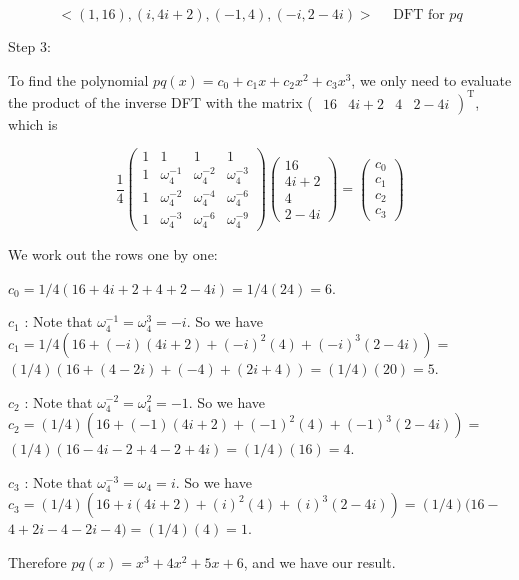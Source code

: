 $$
<(1,16),(i, 4 i+2),(-1,4),(-i, 2-4 i)>\quad \text { DFT for } p q
$$

Step 3:

To find the polynomial $p q(x)=c_{0}+c_{1} x+c_{2} x^{2}+c_{3} x^{3}$, we only need to evaluate the product of the inverse DFT with the matrix ( $\left.\begin{array}{llll}16 & 4 i+2 & 4 & 2-4 i\end{array}\right)^{\mathrm{T}}$, which is

$$
\frac{1}{4}\left(\begin{array}{cccc}
1 & 1 & 1 & 1 \\
1 & \omega_{4}^{-1} & \omega_{4}^{-2} & \omega_{4}^{-3} \\
1 & \omega_{4}^{-2} & \omega_{4}^{-4} & \omega_{4}^{-6} \\
1 & \omega_{4}^{-3} & \omega_{4}^{-6} & \omega_{4}^{-9}
\end{array}\right)\left(\begin{array}{c}
16 \\
4 i+2 \\
4 \\
2-4 i
\end{array}\right)=\left(\begin{array}{l}
c_{0} \\
c_{1} \\
c_{2} \\
c_{3}
\end{array}\right)
$$

We work out the rows one by one:

$c_{0}=1 / 4(16+4 i+2+4+2-4 i)=1 / 4(24)=6$.

$c_{1}$ : Note that $\omega_{4}^{-1}=\omega_{4}^{3}=-i$. So we have $c_{1}=1 / 4\left(16+(-i)(4 i+2)+(-i)^{2}(4)+(-i)^{3}(2-4 i)\right)=$ $(1 / 4)(16+(4-2 i)+(-4)+(2 i+4))=(1 / 4)(20)=5$.

$c_{2}$ : Note that $\omega_{4}^{-2}=\omega_{4}^{2}=-1$. So we have $c_{2}=(1 / 4)\left(16+(-1)(4 i+2)+(-1)^{2}(4)+(-1)^{3}(2-4 i)\right)=$ $(1 / 4)(16-4 i-2+4-2+4 i)=(1 / 4)(16)=4$.

$c_{3}$ : Note that $\omega_{4}^{-3}=\omega_{4}=i$. So we have $c_{3}=(1 / 4)\left(16+i(4 i+2)+(i)^{2}(4)+(i)^{3}(2-4 i)\right)=(1 / 4)(16-$ $4+2 i-4-2 i-4)=(1 / 4)(4)=1$.

Therefore $p q(x)=x^{3}+4 x^{2}+5 x+6$, and we have our result.

